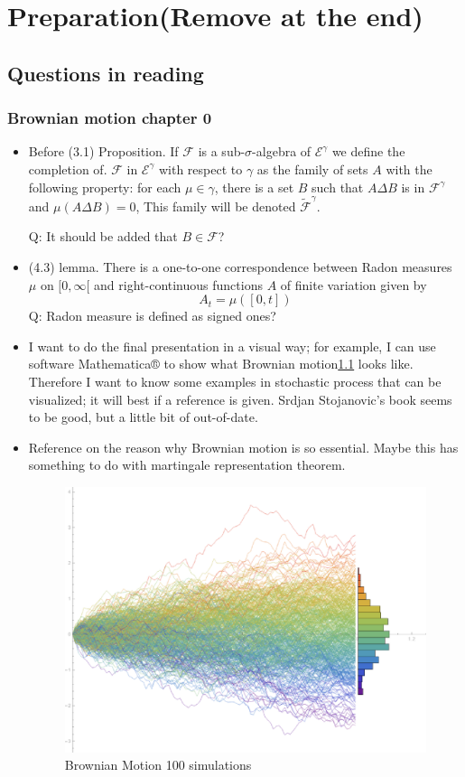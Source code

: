 \chapter{Preparation(Remove at the end)}
\section{Questions in reading}
\subsection{Brownian motion chapter 0}
\begin{itemize}
	\item Before (3.1) Proposition.
	If $\mathscr{F}$ is a sub-$ \sigma $-algebra of $\mathscr{E}^{\gamma}$ we define the completion of. $\mathscr{F}$ in $\mathscr{E}^{\gamma}$ with
	respect to $\gamma$ as the family of sets $A$ with the following property: for each $\mu \in \gamma$, there is a set $B$ such that $A \Delta B$ is in $\mathscr{F} ^{\gamma}$ and $\mu(A \Delta B)=0$,  This family will be
	denoted $\tilde{\mathscr{F}}^ {\gamma}$.
	
	Q: It should be added that $B \in \mathscr{F}$?
	
	\item (4.3) lemma. 
	There is a one-to-one correspondence between Radon measures $\mu$
	on $ [0, \infty[ $ and right-continuous functions $A$ of finite variation given by
	\[
	A_{t}=\mu([0, t])
	\]
	Q: Radon measure is defined as signed ones?
	\item I want to do the final presentation in a visual way; for example, I can use software Mathematica® to show what Brownian motion\ref{fig:wiener-process} looks like.
	Therefore I want to know some examples in stochastic process that can be visualized; it will best if a reference is given.
	Srdjan Stojanovic's book\cite{stojanovic2012computational} seems to be good, but a little bit of out-of-date.
	\item 
	Reference on the reason why Brownian motion is so essential. Maybe this has something to do with martingale representation theorem.	

\begin{figure}[ht]
	\centering
	\includegraphics[width=0.8\linewidth]{"Figures/wiener process"}
	\caption{Brownian Motion 100 simulations}
	\label{fig:wiener-process}
\end{figure}


\end{itemize}
